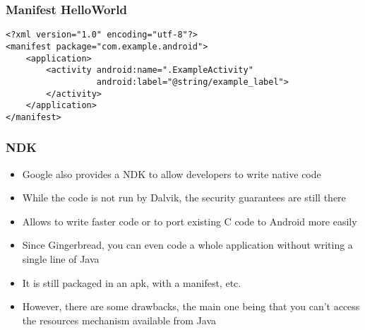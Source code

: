 \begin{frame}[fragile]
  \frametitle{Manifest HelloWorld}
\begin{verbatim}
<?xml version="1.0" encoding="utf-8"?>
<manifest package="com.example.android">
    <application>
        <activity android:name=".ExampleActivity"
                  android:label="@string/example_label">
        </activity>
    </application>
</manifest>
\end{verbatim}
\end{frame}

\begin{frame}
  \frametitle{NDK}
  \begin{itemize}
  \item Google also provides a NDK to allow developers to write native
    code
  \item While the code is not run by Dalvik, the security guarantees
    are still there
  \item Allows to write faster code or to port existing C code to
    Android more easily
  \item Since Gingerbread, you can even code a whole application
    without writing a single line of Java
  \item It is still packaged in an apk, with a manifest, etc.
  \item However, there are some drawbacks, the main one being that you
    can't access the resources mechanism available from Java
  \end{itemize}
\end{frame}
